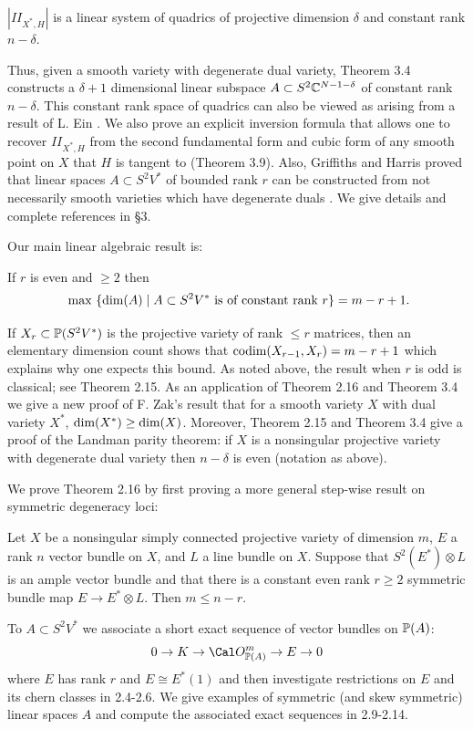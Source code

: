 $|II_{X^*,H}|$ is a linear system of quadrics of projective dimension
$\delta$ and constant rank $n-\delta$.
\endproclaim

Thus, given a smooth variety with degenerate dual variety, 
Theorem 3.4 constructs  a 
$\delta +1$ dimensional linear subspace $A \subset S^2 \Bbb C^{N-1-\delta}$
of constant rank $n-\delta$. This constant rank space of quadrics can
also be viewed as arising from a result of L. Ein \cite{E, Theorem 2.2}.
We also prove an explicit inversion formula that allows one to recover
$II_{X^*,H}$ from the second fundamental form and cubic form of
any smooth point on $X$ that $H$ is tangent to (Theorem 3.9).
Also, Griffiths and Harris proved that linear spaces 
$A \subset S^2 V^*$ of bounded rank $r$ can be constructed from
not necessarily smooth varieties which have degenerate duals \cite{GH2, 3.5}.
We give details and complete references in \S 3.

Our main linear algebraic result is:

 If $r$ is even and $\ge 2$ then
$$\text{ max } \{ \text{dim}(A) \mid A \subset S^2V^* \text{ is of constant rank } r \}
 = m-r+1.$$
\endproclaim

If $X_r \subset \Bbb P(S^2 V^*)$ is the projective variety of 
rank $\le r$ matrices, then an elementary dimension count shows that
$\text{codim}(X_{r-1}, X_r) = m - r + 1$
which explains why one expects this bound. As
noted above, the result when $r$ is odd is classical; see Theorem 2.15. 
As an application of Theorem 2.16 and Theorem 3.4
we give a new proof of F. Zak's result that for a smooth variety $X$
with dual variety $X^*$, $\text{dim}(X^*) \ge \text{dim}(X)$. Moreover, Theorem 2.15
and Theorem 3.4 give a proof of the Landman parity theorem:
if $X$ is a nonsingular projective variety with degenerate dual variety then
$n-\delta$ is even (notation as above).

We prove Theorem 2.16 by first proving a more general step-wise result
on symmetric degeneracy loci:

 Let $X$ be a nonsingular simply connected projective
variety of dimension $m$, $E$ a rank $n$ vector bundle on $X$, and $L$
a line bundle on $X$. Suppose that $S^2(E^{*}) \otimes L$ is an ample 
vector bundle and that there is a constant even rank $r \ge 2$
symmetric bundle map $E \to E^{*} \otimes L$. Then $m \le n-r$.
\endproclaim

To $A \subset S^2V^*$ we associate a short exact sequence of vector bundles on
$\Bbb P(A)$:
$$0 \to K \to \co_{\ppp(A)}^{m} \to E \to 0$$
where $E$ has rank $r$ and
$E \cong E^*(1)$ and then investigate restrictions on $E$ and its 
chern classes in 2.4-2.6. We give examples of symmetric
(and skew symmetric) linear spaces $A$ and compute the associated exact
sequences in 2.9-2.14.

